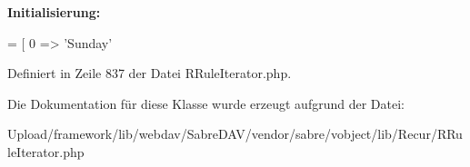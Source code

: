 {\bfseries Initialisierung\+:}
\begin{DoxyCode}
= [
        0 => \textcolor{stringliteral}{'Sunday'}
\end{DoxyCode}


Definiert in Zeile 837 der Datei R\+Rule\+Iterator.\+php.



Die Dokumentation für diese Klasse wurde erzeugt aufgrund der Datei\+:\begin{DoxyCompactItemize}
\item 
Upload/framework/lib/webdav/\+Sabre\+D\+A\+V/vendor/sabre/vobject/lib/\+Recur/R\+Rule\+Iterator.\+php\end{DoxyCompactItemize}
